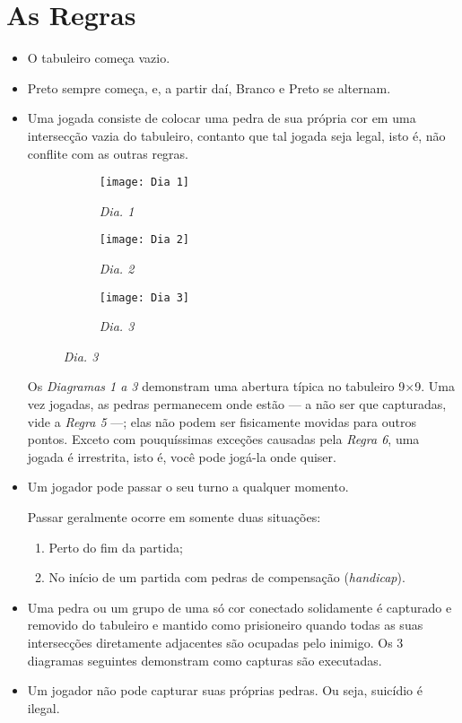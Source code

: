 \chapter{As Regras}\label{chap:regras}

\begin{itemize}
    \item[\textbf{Regra 1}] O tabuleiro começa vazio.
    \item[\textbf{Regra 2}] Preto sempre começa, e, a partir daí, Branco e Preto se alternam. 
    \item[\textbf{Regra 3}] Uma jogada consiste de colocar uma pedra de sua própria cor em uma intersecção vazia do tabuleiro, contanto que tal jogada seja legal, isto é, não conflite com as outras regras.

    \begin{figure}
        \centering
        \begin{subfigure}{.3\textwidth}
            \centering
            \texttt{[image: Dia 1]}
            \caption{\emph{Dia. 1}}
        \end{subfigure}
        \begin{subfigure}{.3\textwidth}
            \centering
            \texttt{[image: Dia 2]}
            \caption{\emph{Dia. 2}}
        \end{subfigure}
        \begin{subfigure}{.3\textwidth}
            \centering
            \texttt{[image: Dia 3]}
            \caption{\emph{Dia. 3}}
        \end{subfigure}
    \end{figure}

    Os \emph{Diagramas 1 a 3} demonstram uma abertura típica no tabuleiro 9\(\times\)9. Uma vez jogadas, as pedras permanecem onde estão --- a não ser que capturadas, vide a \emph{Regra 5} ---; elas não podem ser fisicamente movidas para outros pontos. Exceto com pouquíssimas exceções causadas pela \emph{Regra 6}, uma jogada é irrestrita, isto é, você pode jogá-la onde quiser.
    \item[\textbf{Regra 4}] Um jogador pode passar o seu turno a qualquer momento.
    
    Passar geralmente ocorre em somente duas situações:
        
    \begin{enumerate}
        \item Perto do fim da partida;
        \item No início de um partida com pedras de compensação (\emph{handicap}).
    \end{enumerate}
    \item[\textbf{Regra 5}] Uma pedra ou um grupo de uma só cor conectado solidamente é capturado e removido do tabuleiro e mantido como prisioneiro quando todas as suas intersecções diretamente adjacentes são ocupadas pelo inimigo. Os 3 diagramas seguintes demonstram como capturas são executadas.
    \item[\textbf{Regra 6}] Um jogador não pode capturar suas próprias pedras. Ou seja, suicídio é ilegal.
\end{itemize}

